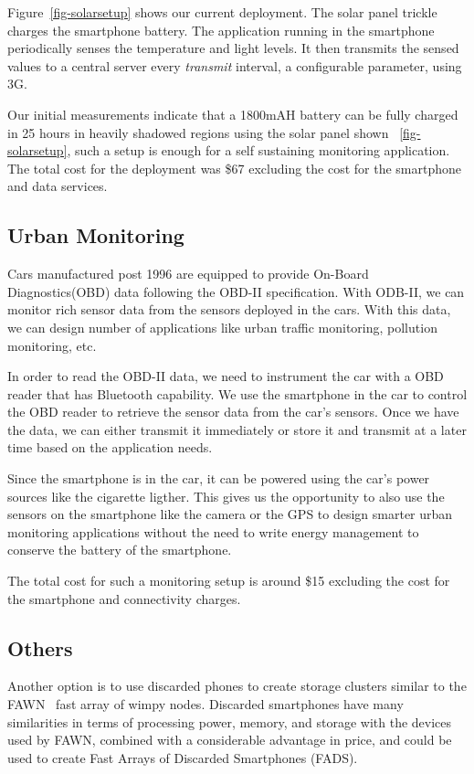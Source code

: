 Figure~\ref{fig-solarsetup} shows our current deployment. The solar panel trickle
charges the smartphone battery. The application running in the smartphone
periodically senses the temperature and light levels. It then transmits the
sensed values to a central server every \textit{transmit} interval, a
configurable parameter, using 3G. 

Our initial measurements indicate that a 1800mAH battery can be fully charged
in 25
hours in heavily shadowed regions using the solar panel shown 
~\ref{fig-solarsetup}, such a setup is
enough for a self sustaining monitoring application. The total cost for the
deployment was \$67 excluding the cost for the smartphone and data services.

\subsection{Urban Monitoring}
Cars manufactured post 1996 are equipped to provide On-Board Diagnostics(OBD)
data following the OBD-II specification. With ODB-II, we can monitor rich
sensor data from the sensors deployed in the cars. With this data, we can design number of
applications like urban traffic monitoring, pollution monitoring, etc. 

In order to read the OBD-II data, we need to instrument the car
with a OBD reader that has Bluetooth capability. We use the smartphone in the car to control
the OBD reader to retrieve the sensor data from the car's sensors. Once we have
the data, we can either transmit it immediately or store it and transmit at a
later time based on the application needs.

Since the smartphone is in the car, it can be powered using the car's power
sources like the cigarette ligther. This gives us the opportunity to also use the sensors on the
smartphone like the camera or the GPS to design smarter urban monitoring
applications without the need to write  energy management to conserve the
battery of the smartphone.

The total cost for such a monitoring setup is around \$15 excluding the cost
for the smartphone and connectivity charges.

\subsection{Others}
Another option is to use discarded phones to create storage clusters similar
to the FAWN~\cite{fawn} fast array of wimpy nodes. Discarded smartphones have
many similarities in terms of processing power, memory, and storage with the
devices used by FAWN, combined with a considerable advantage in price, and
could be used to create Fast Arrays of Discarded Smartphones (FADS).
